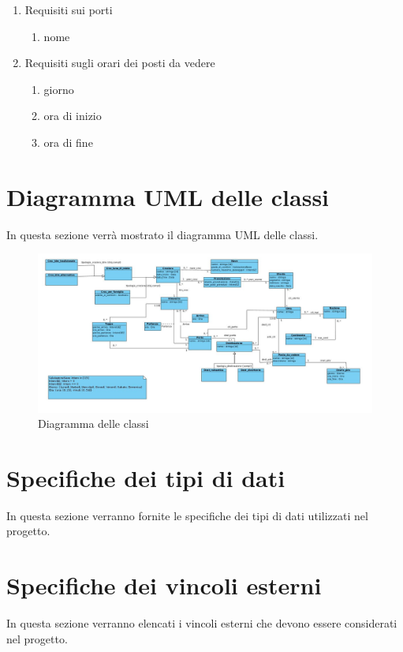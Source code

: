 \documentclass{article}
\begin{document}
\begin{enumerate}
\begin{enumerate}
    \end{enumerate}
    \item Requisiti sui porti
    \begin{enumerate}
        \item nome
    \end{enumerate}
    \item Requisiti sugli orari dei posti da vedere
    \begin{enumerate}
        \item giorno
        \item ora di inizio
        \item ora di fine
    \end{enumerate}
\end{enumerate}


\section{Diagramma UML delle classi}

In questa sezione verrà mostrato il diagramma UML delle classi.
\begin{figure}[h]
    \centering
    \includegraphics[width=\textwidth]{../Diagramma delle classi Travel To The Moon.jpg}
    \caption{Diagramma delle classi}
    \end{figure}

\section{Specifiche dei tipi di dati}

In questa sezione verranno fornite le specifiche dei tipi di dati utilizzati nel progetto.

\section{Specifiche dei vincoli esterni}

In questa sezione verranno elencati i vincoli esterni che devono essere considerati nel progetto.
\end{document}
